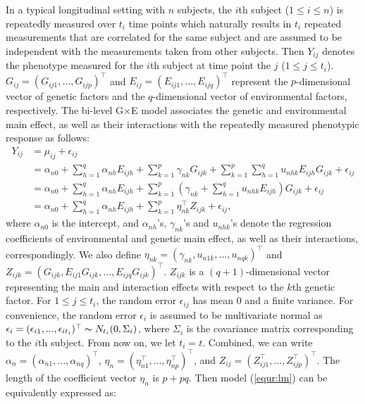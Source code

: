 \documentclass[12pt]{article}
\begin{document}
In a typical longitudinal setting with $n$ subjects, the $i$th subject ($1 \leqslant i \leqslant n$) is repeatedly measured over $t_i$ time points which naturally results in $t_i$ repeated measurements that are correlated for the same subject and are assumed to be independent with the measurements taken from other subjects. Then $Y_{ij}$ denotes the phenotype measured for the $i$th subject at time point the $j$ ($1 \leqslant j \leqslant t_i$). $G_{ij}=(G_{ij1},...,G_{ijp})^\top$ and $E_{ij}=(E_{ij1},...,E_{ijq})^\top$ represent the $p$-dimensional vector of genetic factors and the $q$-dimensional vector of environmental factors, respectively.  The bi-level G$\times$E model associates the genetic and environmental main effect, as well as their interactions with the repeatedly measured phenotypic response as follows:
\begin{equation}\label{equr:lm}
	\begin{aligned}
		Y_{ij} & =  \mu_{ij}+\epsilon_{ij}\\
		& = \alpha_{n0} + \sum_{h=1}^{q}\alpha_{nh} E_{ijh} + \sum_{k=1}^{p}\gamma_{nk} G_{ijk} + \sum_{k=1}^{p}\sum_{h=1}^{q}u_{nhk} E_{ijh} G_{ijk}+\epsilon_{ij}\\
		&=\alpha_{n0} + \sum_{h=1}^{q}\alpha_{nh} E_{ijh} + \sum_{k=1}^{p}(\gamma_{nk} + \sum_{h=1}^{q}u_{nhk} E_{ijh} )G_{ijk}+\epsilon_{ij}\\
		&=\alpha_{n0} + \sum_{h=1}^{q}\alpha_{nh} E_{ijh} + \sum_{k=1}^{p}\eta_{nk}^\top Z_{ijk}+\epsilon_{ij},
	\end{aligned}
\end{equation}
where $\alpha_{n0}$ is the intercept, and  $\alpha_{nh}$'s, $\gamma_{nk}$'s and $u_{nhk}$'s denote the regression coefficients of environmental and genetic main effect, as well as their interactions, correspondingly. We also define $\eta_{nk}=(\gamma_{nk}, u_{n1k}, ..., u_{nqk})^\top$ and $Z_{ijk}=(G_{ijk}, E_{ij1}G_{ijk}, ..., E_{ijq}G_{ijk})^\top$. $Z_{ijk}$ is a $(q+1)$-dimensional vector representing the main and interaction effects with respect to the $k$th genetic factor. For $1 \leqslant j \leqslant t_i$, the random error $\epsilon_{ij}$ has mean 0 and a finite variance. For convenience, the random error $\epsilon_{i}$ is assumed to be multivariate normal as  $\epsilon_{i}=(\epsilon_{i1},...,\epsilon_{it_i})^{\top}\thicksim N_{t_i}(0,\Sigma_{i})$, where $\Sigma_i$ is the covariance matrix corresponding to the $i$th subject. From now on, we let $t_i=t$. Combined, we can write $\alpha_n=(\alpha_{n1}, ..., \alpha_{nq})^\top$, $\eta_n=(\eta_{n1}^\top, ..., \eta_{np}^\top)^\top$, and $Z_{ij}=(Z_{ij1}^\top, ..., Z_{ijp}^\top)^\top$.  The length of the coefficient vector $\eta_n$ is $p+pq$. Then model (\ref{equr:lm}) can be equivalently expressed as:
\end{document}
